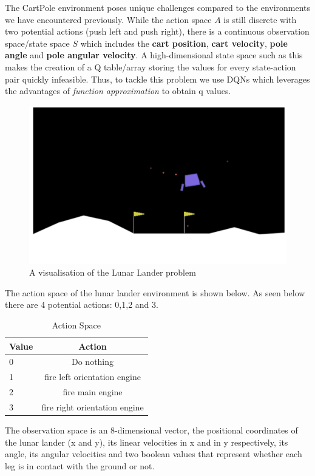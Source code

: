 \documentclass{article}
\begin{document}
The CartPole environment poses unique challenges compared to the environments we have encountered previously. While the action space $A$ is still discrete with two potential actions (push left and push right), there is a continuous observation space/state space $S$ which includes the \textbf{cart position}, \textbf{cart velocity}, \textbf{pole angle} and \textbf{pole angular velocity}. A high-dimensional state space such as this makes the creation of a Q table/array storing the values for every state-action pair quickly infeasible. Thus, to tackle this problem we use DQNs which leverages the advantages of \emph{function approximation} to obtain q values. 

\begin{figure}[htbp]
\centering
\includegraphics[width=0.6\linewidth]{Report/images/visualisation.png}
\caption{\label{fig:Visualization of the Cart-pole} A visualisation of the Lunar Lander problem}
\end{figure}



The action space of the lunar lander environment is shown below. 
As seen below there are 4 potential actions: 0,1,2 and 3. 

\begin{table}[htbp]
\centering
\begin{tabular}{|l|c|}
\hline
\textbf{Value} & \textbf{Action} \\
\hline
0  & Do nothing \\
\hline
1 & fire left orientation engine \\
\hline
2  & fire main engine \\
\hline
3 & fire right orientation engine  \\
\hline
\end{tabular}
\caption{Action Space}
\label{tab:hyper-parameters}
\end{table}

The observation space is an 8-dimensional vector, the positional coordinates of the lunar lander (x and y), its linear velocities in x and in y respectively, its angle, its angular velocities and two boolean values that represent whether each leg is in contact with the ground or not. 
\end{document}
